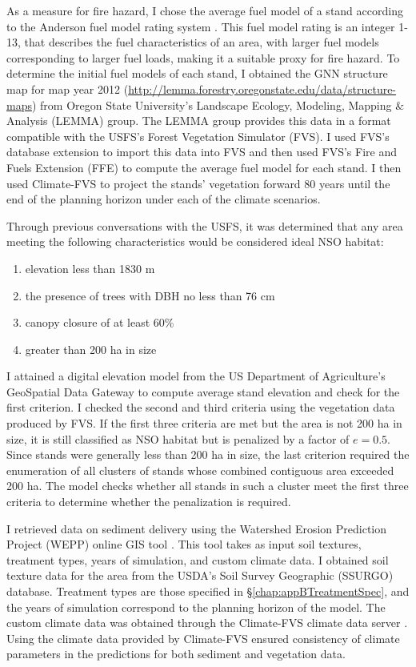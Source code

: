 As a measure for fire hazard, I chose the average fuel model of a stand according to the Anderson fuel model rating system \cite{anderson1982aids}. This fuel model rating is an integer 1-13, that describes the fuel characteristics of an area, with larger fuel models corresponding to larger fuel loads, making it a suitable proxy for fire hazard. To determine the initial fuel models of each stand, I obtained the GNN structure map for map year 2012 (\url{http://lemma.forestry.oregonstate.edu/data/structure-maps}) from Oregon State University's Landscape Ecology, Modeling, Mapping \& Analysis (LEMMA) group. The LEMMA group provides this data in a format compatible with the USFS's Forest Vegetation Simulator (FVS). I used FVS's database extension to import this data into FVS and then used FVS's Fire and Fuels Extension\cite{reinhardt2003fire} (FFE) to compute the average fuel model for each stand. I then used Climate-FVS to project the stands' vegetation forward 80 years until the end of the planning horizon under each of the climate scenarios.

Through previous conversations with the USFS, it was determined that any area meeting the following characteristics would be considered ideal NSO habitat:
\begin{enumerate}
\item elevation less than 1830 m
\item the presence of trees with DBH no less than 76 cm
\item canopy closure of at least 60\%
\item greater than 200 ha in size
\end{enumerate}
I attained a digital elevation model from the US Department of Agriculture's GeoSpatial Data Gateway to compute average stand elevation and check for the first criterion. I checked the second and third criteria using the vegetation data produced by FVS. If the first three criteria are met but the area is not 200 ha in size, it is still classified as NSO habitat but is penalized by a factor of $e = 0.5$. Since stands were generally less than 200 ha in size, the last criterion required the enumeration of all clusters of stands whose combined contiguous area exceeded 200 ha. The model checks whether all stands in such a cluster meet the first three criteria to determine whether the penalization is required.

I retrieved data on sediment delivery using the Watershed Erosion Prediction Project (WEPP) online GIS tool \cite{frankenberger2011development}. This tool takes as input soil textures, treatment types, years of simulation, and custom climate data. I obtained soil texture data for the area from the USDA's Soil Survey Geographic (SSURGO) database. Treatment types are those specified in \S \ref{chap:appBTreatmentSpec}, and the years of simulation correspond to the planning horizon of the model. The custom climate data was obtained through the Climate-FVS climate data server \cite{climateFVSReadyData}. Using the climate data provided by Climate-FVS ensured consistency of climate parameters in the predictions for both sediment and vegetation data.

